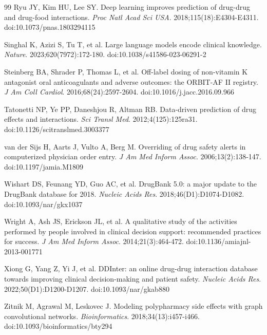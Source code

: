 \documentclass[11pt,a4paper]{article}
\begin{document}
\begin{thebibliography}{99}
Ryu JY, Kim HU, Lee SY.
Deep learning improves prediction of drug-drug and drug-food interactions.
\textit{Proc Natl Acad Sci USA}. 2018;115(18):E4304-E4311. doi:10.1073/pnas.1803294115

Singhal K, Azizi S, Tu T, et al.
Large language models encode clinical knowledge.
\textit{Nature}. 2023;620(7972):172-180. doi:10.1038/s41586-023-06291-2

Steinberg BA, Shrader P, Thomas L, et al.
Off-label dosing of non-vitamin K antagonist oral anticoagulants and adverse outcomes: the ORBIT-AF II registry.
\textit{J Am Coll Cardiol}. 2016;68(24):2597-2604. doi:10.1016/j.jacc.2016.09.966

Tatonetti NP, Ye PP, Daneshjou R, Altman RB.
Data-driven prediction of drug effects and interactions.
\textit{Sci Transl Med}. 2012;4(125):125ra31. doi:10.1126/scitranslmed.3003377

van der Sijs H, Aarts J, Vulto A, Berg M.
Overriding of drug safety alerts in computerized physician order entry.
\textit{J Am Med Inform Assoc}. 2006;13(2):138-147. doi:10.1197/jamia.M1809

Wishart DS, Feunang YD, Guo AC, et al.
DrugBank 5.0: a major update to the DrugBank database for 2018.
\textit{Nucleic Acids Res}. 2018;46(D1):D1074-D1082. doi:10.1093/nar/gkx1037

Wright A, Ash JS, Erickson JL, et al.
A qualitative study of the activities performed by people involved in clinical decision support: recommended practices for success.
\textit{J Am Med Inform Assoc}. 2014;21(3):464-472. doi:10.1136/amiajnl-2013-001771

Xiong G, Yang Z, Yi J, et al.
DDInter: an online drug-drug interaction database towards improving clinical decision-making and patient safety.
\textit{Nucleic Acids Res}. 2022;50(D1):D1200-D1207. doi:10.1093/nar/gkab880

Zitnik M, Agrawal M, Leskovec J.
Modeling polypharmacy side effects with graph convolutional networks.
\textit{Bioinformatics}. 2018;34(13):i457-i466. doi:10.1093/bioinformatics/bty294

\end{thebibliography}
\end{document}
